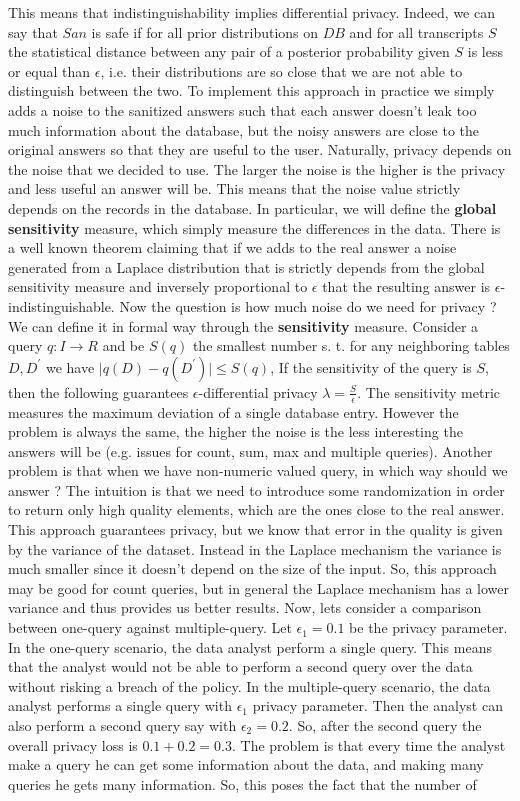 This means that indistinguishability implies differential privacy. Indeed, we can say that $San$ is safe if for all prior distributions on $DB$ and for all transcripts $S$ the statistical distance between any pair of a posterior probability given $S$ is less or equal than $\epsilon$, i.e. their distributions are so close that we are not able to distinguish between the two. To implement this approach in practice we simply adds a noise to the sanitized answers such that each answer doesn't leak too much information about the database, but the noisy answers are close to the original answers so that they are useful to the user. Naturally, privacy depends on the noise that we decided to use. The larger the noise is the higher is the privacy and less useful an answer will be. This means that the noise value strictly depends on the records in the database. In particular, we will define the \textbf{global sensitivity} measure, which simply measure the differences in the data. There is a well known theorem claiming that if we adds to the real answer a noise generated from a Laplace distribution that is strictly depends from the global sensitivity measure and inversely proportional to $\epsilon$ that the resulting answer is $\epsilon$-indistinguishable. Now the question is how much noise do we need for privacy ? We can define it in formal way through the \textbf{sensitivity} measure. Consider a query $q : I \rightarrow R$ and be $S(q)$ the smallest number s. t. for any neighboring tables $D, D^{'}$ we have $\mid q(D) - q(D^{'}) \mid \leq S(q)$, If the sensitivity of the query is $S$, then the following guarantees $\epsilon$-differential privacy $\lambda = \frac{S}{\epsilon}$. The sensitivity metric measures the maximum deviation of a single database entry. However the problem is always the same, the higher the noise is the less interesting the answers will be (e.g. issues for count, sum, max and multiple queries). Another problem is that when we have non-numeric valued query, in which way should we answer ? The intuition is that we need to introduce some randomization in order to return only high quality elements, which are the ones close to the real answer. This approach guarantees privacy, but we know that error in the quality is given by the variance of the dataset. Instead in the Laplace mechanism the variance is much smaller since it doesn't depend on the size of the input. So, this approach may be good for count queries, but in general the Laplace mechanism has a lower variance and thus provides us better results. Now, lets consider a comparison between one-query against multiple-query. Let $\epsilon_{1} = 0.1$ be the privacy parameter. In the one-query scenario, the data analyst perform a single query. This means that the analyst would not be able to perform a second query over the data without risking a breach of the policy. In the multiple-query scenario, the data analyst performs a single query with $\epsilon_{1}$ privacy parameter. Then the analyst can also perform a second query say with $\epsilon_{2} = 0.2$. So, after the second query the overall privacy loss is $0.1 + 0.2 = 0.3$. The problem is that every time the analyst make a query he can get some information about the data, and making many queries he gets many information. So, this poses the fact that the number of 
